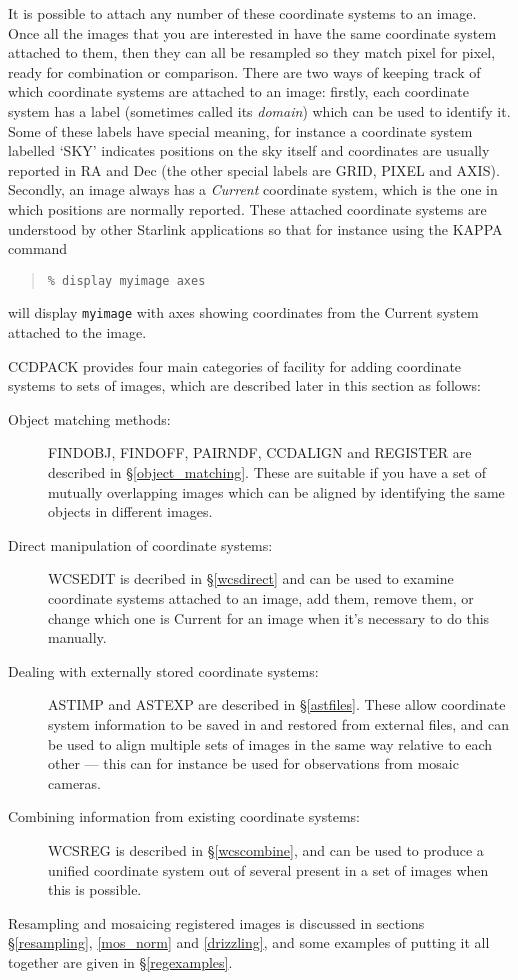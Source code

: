 \documentclass[twoside,11pt]{article}
\newcommand{\hyperref}[4]{#2\ref{#4}#3}
\renewcommand{\_}{\texttt{\symbol{95}}}
\newenvironment{myquote}{\begin{quote}\begin{small}}{\end{small}\end{quote}}
\newcommand{\routine}[1]{{\sc #1}}
\begin{document}
It is possible to attach any number of these coordinate systems 
to an image.  Once all the images that you are interested in
have the same coordinate system attached to them, then
they can all be resampled so they match pixel for pixel,
ready for combination or comparison.
There are two ways of keeping track of which coordinate systems
are attached to an image: firstly, each coordinate system has a label 
(sometimes called its {\em domain\/}) which can be used to identify it.
Some of these
labels have special meaning, for instance a coordinate system labelled 
`SKY' indicates
positions on the sky itself and coordinates are usually reported in
RA and Dec
(the other special labels are GRID, PIXEL and AXIS).
Secondly, an image
always has a {\em Current\/} coordinate system, which is the
one in which positions are normally reported.
These attached 
coordinate systems are understood by other Starlink applications
so that for instance using the KAPPA command
\begin{myquote}
\begin{verbatim}
% display myimage axes
\end{verbatim}
\end{myquote}
will display {\tt myimage} with axes showing coordinates from
the Current system attached to the image.

CCDPACK provides four main categories of facility 
for adding coordinate systems to sets of images, 
which are described later in this section as follows:
\begin{description}
\item[Object matching methods:]
\routine{FINDOBJ}, \routine{FINDOFF}, \routine{PAIRNDF}, \routine{CCDALIGN}
and \routine{REGISTER} are described 
\hyperref{here}{in \S}{}{object_matching}.
These are suitable if you have a set of mutually overlapping images
which can be aligned by identifying the same objects in different images.
%
\item[Direct manipulation of coordinate systems:]
\routine{WCSEDIT} is decribed 
\hyperref{here}{in \S}{}{wcsdirect} and
can be used to examine coordinate systems attached to an image, 
add them, remove them, or change which one is Current for an image when 
it's necessary to do this manually.
%
\item[Dealing with externally stored coordinate systems:]
\routine{ASTIMP} and \routine{ASTEXP} are described 
\hyperref{here}{in \S}{}{astfiles}.
These allow coordinate system information to be saved in and restored
from external files, and can be used to align multiple sets of images 
in the same way relative to each other --- this can for instance be
used for observations from mosaic cameras.
%
\item[Combining information from existing coordinate systems:]
\routine{WCSREG} is described
\hyperref{here}{in \S}{}{wcscombine},
and can be used to produce a unified coordinate system out of several
present in a set of images when this is possible.
\end{description}
Resampling and mosaicing registered images is discussed in 
sections \S\ref{resampling}, \ref{mos_norm} and \ref{drizzling},
and some examples of putting it all together are given in 
\S\ref{regexamples}.
\end{document}
